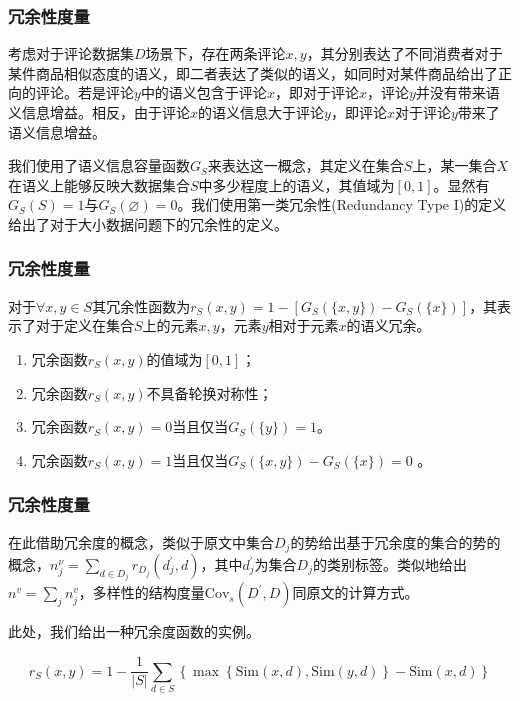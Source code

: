\documentclass{../presentation}
\newcommand{\Cov}{\text{Cov}}
\newcommand{\Sim}{\text{Sim}}
\begin{document}
    \begin{frame}
        \frametitle{冗余性度量}

        考虑对于评论数据集$D$场景下，存在两条评论$x, y$，其分别表达了不同消费者对于某件商品相似态度的语义，即二者表达了类似的语义，如同时对某件商品给出了正向的评论。若是评论$y$中的语义包含于评论$x$，即对于评论$x$，评论$y$并没有带来语义信息增益。相反，由于评论$x$的语义信息大于评论$y$，即评论$x$对于评论$y$带来了语义信息增益。

        我们使用了语义信息容量函数$G_S$来表达这一概念，其定义在集合$S$上，某一集合$X$在语义上能够反映大数据集合$S$中多少程度上的语义，其值域为$[0,1]$。显然有$G_S(S) = 1$与$G_S(\varnothing) = 0$。我们使用第一类冗余性(Redundancy Type I)的定义给出了对于大小数据问题下的冗余性的定义。

    \end{frame}

    \begin{frame}
        \frametitle{冗余性度量}

        对于$\forall x, y\in S$其冗余性函数为$r_S(x, y) = 1 - \left[G_S(\{x, y\}) - G_S(\{x\})\right]$，其表示了对于定义在集合$S$上的元素$x, y$，元素$y$相对于元素$x$的语义冗余。

        \begin{enumerate}
            \item 冗余函数$r_S(x, y)$的值域为$[0,1]$；
            \item 冗余函数$r_S(x, y)$不具备轮换对称性；
            \item 冗余函数$r_S(x, y)=0$当且仅当$G_S(\{y\}) = 1$。
            \item 冗余函数$r_S(x, y)=1$当且仅当$G_S(\{x, y\}) - G_S(\{x\}) = 0$ 。
        \end{enumerate}
    \end{frame}

    \begin{frame}
        \frametitle{冗余性度量}

        在此借助冗余度的概念，类似于原文中集合$D_j$的势给出基于冗余度的集合的势的概念，$n_j^\nu=\sum_{d\in D_j}{r_{D_j}(d_j^\prime,d)}$，其中$d_j^\prime$为集合$D_j$的类别标签。类似地给出$n^v=\sum_{j} n_j^v$，多样性的结构度量$\Cov_s(D^\prime,D)$同原文的计算方式。

        此处，我们给出一种冗余度函数的实例。

        \begin{equation}
            r_S\left(x,y\right)=1-\frac{1}{\left|S\right|}\sum_{d\in S}\left\{\max\left\{\Sim\left(x,d\right),\Sim\left(y,d\right)\right\}-\Sim\left(x,d\right)\right\} \label{eq:4}
        \end{equation}
    \end{frame}
\end{document}
